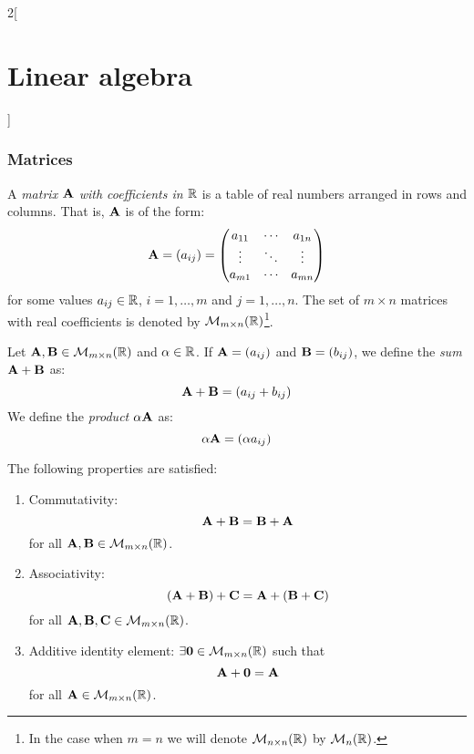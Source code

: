 \documentclass[../../../main.tex]{subfiles}
\begin{document}
\begin{multicols}{2}[\section{Linear algebra}]
    \subsubsection*{Matrices}
    \begin{definition}[Matrix]
        A \textit{matrix $\boldsymbol{\mathrm{A}}$ with coefficients in $\mathbb{R}$} is a table of real numbers arranged in rows and columns. That is, $\boldsymbol{\mathrm{A}}$ is of the form:
        \begin{equation*}
            \boldsymbol{\mathrm{A}}=(a_{ij})=
            \begin{pmatrix}
                a_{11} & \cdots & a_{1n} \\
                \vdots & \ddots & \vdots \\
                a_{m1} & \cdots & a_{mn}
            \end{pmatrix}
        \end{equation*}
        for some values $a_{ij}\in\mathbb{R}$, $i=1,\ldots,m$ and $j=1,\ldots,n$. The set of $m\times n$ matrices with real coefficients is denoted by $\mathcal{M}_{m\times n}(\mathbb{R})$\footnote{In the case when $m=n$ we will denote $\mathcal{M}_{n\times n}(\mathbb{R})$ by $\mathcal{M}_n(\mathbb{R})$.}.
    \end{definition}
    \begin{definition}
        Let $\boldsymbol{\mathrm{A}},\boldsymbol{\mathrm{B}}\in\mathcal{M}_{m\times n}(\mathbb{R})$ and $\alpha\in\mathbb{R}$. If $\boldsymbol{\mathrm{A}}=(a_{ij})$ and $\boldsymbol{\mathrm{B}}=(b_{ij})$, we define the \textit{sum $\boldsymbol{\mathrm{A}}+\boldsymbol{\mathrm{B}}$} as: $$\boldsymbol{\mathrm{A}}+\boldsymbol{\mathrm{B}}=(a_{ij}+b_{ij})$$
        We define the \textit{product $\alpha\boldsymbol{\mathrm{A}}$} as: $$\alpha\boldsymbol{\mathrm{A}}=(\alpha a_{ij})$$
    \end{definition}
    \begin{prop}
        The following properties are satisfied:
        \begin{enumerate}
            \item Commutativity: $$\boldsymbol{\mathrm{A}}+\boldsymbol{\mathrm{B}}=\boldsymbol{\mathrm{B}}+\boldsymbol{\mathrm{A}}$$ for all $\boldsymbol{\mathrm{A}},\boldsymbol{\mathrm{B}}\in\mathcal{M}_{m\times n}(\mathbb{R})$.
            \item Associativity: $$(\boldsymbol{\mathrm{A}}+\boldsymbol{\mathrm{B}})+\boldsymbol{\mathrm{C}}=\boldsymbol{\mathrm{A}}+(\boldsymbol{\mathrm{B}}+\boldsymbol{\mathrm{C}})$$ for all $\boldsymbol{\mathrm{A}},\boldsymbol{\mathrm{B}},\boldsymbol{\mathrm{C}}\in\mathcal{M}_{m\times n}(\mathbb{R})$.
            \item Additive identity element: $\exists\boldsymbol{\mathrm{0}}\in\mathcal{M}_{m\times n}(\mathbb{R})$ such that $$\boldsymbol{\mathrm{A}}+\boldsymbol{\mathrm{0}}=\boldsymbol{\mathrm{A}}$$ for all $\boldsymbol{\mathrm{A}}\in\mathcal{M}_{m\times n}(\mathbb{R})$.

\end{enumerate}
\end{prop}
\end{multicols}
\end{document}
